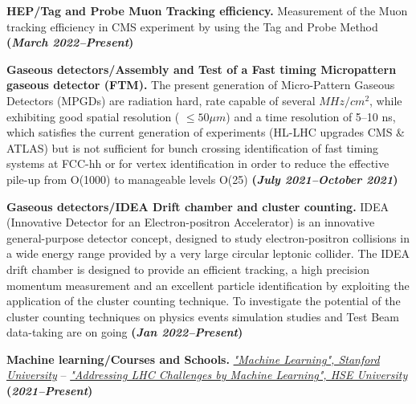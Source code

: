 \documentclass[11pt]{res}
\begin{document}
\begin{resume}
\textbf{HEP/Tag and Probe Muon Tracking efficiency.} Measurement of the Muon tracking efficiency in CMS experiment by using the Tag and Probe Method \textbf{(\textit{March 2022--Present})}

\textbf{Gaseous detectors/Assembly and Test of a Fast timing Micropattern gaseous detector (FTM).} 
The present generation of Micro-Pattern Gaseous Detectors (MPGDs) are radiation hard, rate capable of several $MHz/cm^{2}$, while exhibiting good spatial resolution ( $\le 50\mu m$) and a time resolution of 5–10 ns, which satisfies the current generation of experiments (HL-LHC upgrades CMS \& ATLAS) but is not sufficient for bunch crossing identification of fast timing systems at FCC-hh or for vertex identification in order to reduce the effective pile-up from O(1000) to manageable levels O(25) \textbf{(\textit{July 2021--October 2021})}

\textbf{Gaseous detectors/IDEA Drift chamber and cluster counting.} 
IDEA (Innovative Detector for an Electron-positron Accelerator) is an innovative general-purpose detector concept, designed to study electron-positron collisions in a wide energy range provided by a very large circular leptonic collider. The IDEA drift chamber is designed to provide an efficient tracking, a high precision momentum measurement and an excellent particle identification by exploiting the application of the cluster counting technique. To investigate the potential of the cluster counting techniques on physics events simulation studies and Test Beam data-taking are on going \textbf{(\textit{Jan 2022--Present})}

\textbf{Machine learning/Courses and Schools.}
\href{https://www.coursera.org/account/accomplishments/verify/DRRN6452E8WB?utm_product=course}{\textit{"Machine Learning", Stanford University}} -- \href{https://www.coursera.org/account/accomplishments/certificate/MY4HQAEAYL9D}{\textit{"Addressing LHC Challenges by Machine Learning",  HSE University}} \textbf{(\textit{2021--Present})}


\end{resume}
\end{document}
